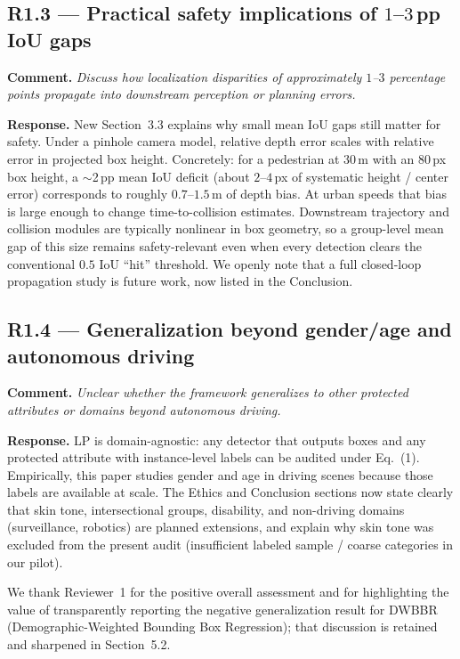 \documentclass[11pt]{article}
\begin{document}
\subsection*{R1.3 --- Practical safety implications of $1$--$3$\,pp IoU gaps}

\textbf{Comment.}
\textit{Discuss how localization disparities of approximately $1$--$3$
percentage points propagate into downstream perception or planning errors.}

\textbf{Response.}
New Section~3.3 explains why small mean IoU gaps still matter for safety.
Under a pinhole camera model, relative depth error scales with relative error
in projected box height. Concretely: for a pedestrian at $30$\,m with an
$80$\,px box height, a $\sim$2\,pp mean IoU deficit (about $2$--$4$\,px of
systematic height / center error) corresponds to roughly $0.7$--$1.5$\,m of
depth bias. At urban speeds that bias is large enough to change time-to-collision
estimates. Downstream trajectory and collision modules are typically nonlinear
in box geometry, so a group-level mean gap of this size remains safety-relevant
even when every detection clears the conventional $0.5$ IoU ``hit'' threshold.
We openly note that a full closed-loop propagation study is future work, now
listed in the Conclusion.

\subsection*{R1.4 --- Generalization beyond gender/age and autonomous driving}

\textbf{Comment.}
\textit{Unclear whether the framework generalizes to other protected attributes
or domains beyond autonomous driving.}

\textbf{Response.}
LP is domain-agnostic: any detector that outputs boxes and any protected
attribute with instance-level labels can be audited under Eq.~(1). Empirically,
this paper studies gender and age in driving scenes because those labels are
available at scale. The Ethics and Conclusion sections now state clearly that
skin tone, intersectional groups, disability, and non-driving domains
(surveillance, robotics) are planned extensions, and explain why skin tone was
excluded from the present audit (insufficient labeled sample / coarse
categories in our pilot).

\vspace{0.3em}
\noindent We thank Reviewer~1 for the positive overall assessment and for
highlighting the value of transparently reporting the negative generalization
result for DWBBR (Demographic-Weighted Bounding Box Regression); that
discussion is retained and sharpened in Section~5.2.
\end{document}
